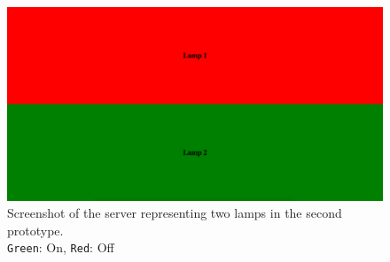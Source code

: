 \begin{figure}
    \centering
    \includegraphics[scale=0.2]{images/Prototype2_Server.png}
    \caption[caption]{Screenshot of the server representing two lamps in the second prototype.\\\texttt{Green}: On, \texttt{Red}: Off}
    \label{fig:prototype2-server-screenshot}
\end{figure}
